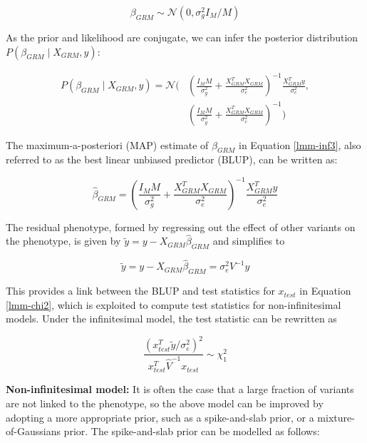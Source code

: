 \begin{equation}
    \beta_{GRM} \sim \mathcal{N}(0, \sigma_g^2 I_M/M)
\end{equation}

%
As the prior and likelihood are conjugate, we can infer the posterior distribution $P(\beta_{GRM} \mid X_{GRM}, y)$:

\begin{equation}
    \begin{split}
        P(\beta_{GRM} \mid X_{GRM}, y) = \mathcal{N}\Bigg( &\left( \frac{I_M M}{\sigma_g^2} + \frac{X_{GRM}^T X_{GRM}}{\sigma_e^2} \right) ^{-1} \frac{X_{GRM}^T y}{\sigma_e^2}, \\
        &\left( \frac{I_M M}{\sigma_g^2} + \frac{X_{GRM}^T X_{GRM}}{\sigma_e^2} \right) ^{-1} \Bigg) \label{lmm-inf3}
    \end{split}
\end{equation}

%
The maximum-a-posteriori (MAP) estimate of $\beta_{GRM}$ in Equation \ref{lmm-inf3}, also referred to as the best linear unbiased predictor (BLUP), can be written as:

\begin{equation}
    \hat{\beta}_{GRM} = \left( \frac{I_M M}{\sigma_g^2} + \frac{X_{GRM}^T X_{GRM}}{\sigma_e^2} \right) ^{-1} \frac{X_{GRM}^T y}{\sigma_e^2} 
\end{equation}

%
The residual phenotype, formed by regressing out the effect of other variants on the phenotype, is given by $\tilde{y} = y - X_{GRM} \hat{\beta}_{GRM}$ and simplifies to

\begin{equation}
    \tilde{y} = y - X_{GRM} \hat{\beta}_{GRM} = \sigma_e^2 V^{-1} y
    \label{blup_lmm_link}
\end{equation}

%
This provides a link between the BLUP and test statistics for $x_{test}$ in Equation \ref{lmm-chi2}, which is exploited to compute test statistics for non-infinitesimal models.
%
Under the infinitesimal model, the test statistic can be rewritten as

\begin{equation}
    \frac{(x_{test}^T \tilde{y}/\sigma_e^2)^2}{x_{test}^T \hat{V}^{-1} x_{test}} \sim \chi^2_1
    \label{blup_lmm}
\end{equation}

%
%
\textbf{Non-infinitesimal model: }
%
It is often the case that a large fraction of variants are not linked to the phenotype, so the above model can be improved by adopting a more appropriate prior, such as a spike-and-slab prior, or a mixture-of-Gaussians prior.
%
The spike-and-slab prior can be modelled as follows:

